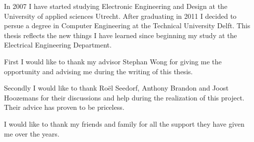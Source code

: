 

\vskip 1cm
In 2007 I have started studying Electronic Engineering and Design at the University of applied sciences Utrecht. After graduating in 2011 I decided to persue a degree in Computer Engineering at the Technical University Delft. This thesis reflects the new things I have learned since beginning my study at the Electrical Engineering Department.

First I would like to thank my advisor Stephan Wong for giving me the opportunity and advising me during the writing of this thesis.

Secondly I would like to thank Roël Seedorf, Anthony Brandon and Joost Hoozemans for their discussions and help during the realization of this project. Their advice has proven to be priceless.

I would like to thank my friends and family for all the support they have given me over the years.

\vskip 2cm
\noindent \AUTHOR \\
\PLACE \\
\DATE

